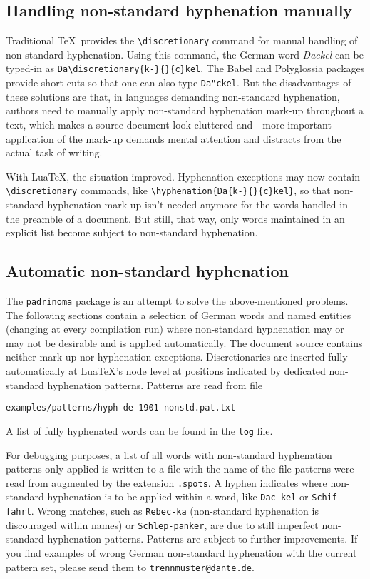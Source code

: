\documentclass{article}
\begin{document}
\subsection{Handling non-standard hyphenation manually}

Traditional \TeX\ provides the \verb+\discretionary+ command for manual
handling of non-standard hyphenation.  Using this command, the German
word \emph{Dackel} can be typed-in as
\verb+Da\discretionary{k-}{}{c}kel+.  The Babel and Polyglossia packages
provide short-cuts so that one can also type \verb+Da"ckel+.  But the
disadvantages of these solutions are that, in languages demanding
non-standard hyphenation, authors need to manually apply non-standard
hyphenation mark-up throughout a text, which makes a source document
look cluttered and---more important---application of the mark-up demands
mental attention and distracts from the actual task of writing.

With Lua\TeX, the situation improved.  Hyphenation exceptions may now
contain \verb+\discretionary+ commands, like
\verb+\hyphenation{Da{k-}{}{c}kel}+, so that non-standard hyphenation
mark-up isn't needed anymore for the words handled in the preamble of a
document.  But still, that way, only words maintained in an explicit
list become subject to non-standard hyphenation.

\subsection{Automatic non-standard hyphenation}

The \texttt{padrinoma} package is an attempt to solve the
above-mentioned problems.  The following sections contain a selection of
German words and named entities (changing at every compilation run)
where non-standard hyphenation may or may not be desirable and is
applied automatically.  The document source contains neither mark-up nor
hyphenation exceptions.  Discretionaries are inserted fully
automatically at Lua\TeX's node level at positions indicated by
dedicated non-standard hyphenation patterns.  Patterns are read from
file
\begin{center}
\verb+examples/patterns/hyph-de-1901-nonstd.pat.txt+
\end{center}
A list of fully hyphenated words can be found in the \verb+log+ file.

For debugging purposes, a list of all words with non-standard
hyphenation patterns only applied is written to a file with the name of
the file patterns were read from augmented by the extension
\verb+.spots+.  A hyphen indicates where non-standard hyphenation is to
be applied within a word, like \verb+Dac-kel+ or \verb+Schif-fahrt+.
Wrong matches, such as \verb+Rebec-ka+ (non-standard hyphenation is
discouraged within names) or \verb+Schlep-panker+, are due to still
imperfect non-standard hyphenation patterns.  Patterns are subject to
further improvements.  If you find examples of wrong German non-standard
hyphenation with the current pattern set, please send them to
\verb+trennmuster@dante.de+.
\end{document}
